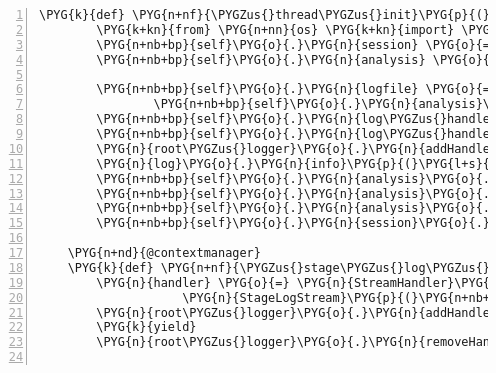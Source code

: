 \begin{Verbatim}[commandchars=\\\{\},numbers=left,firstnumber=1,stepnumber=5]
    \PYG{k}{def} \PYG{n+nf}{\PYGZus{}thread\PYGZus{}init}\PYG{p}{(}\PYG{n+nb+bp}{self}\PYG{p}{)}\PYG{p}{:}
        \PYG{k+kn}{from} \PYG{n+nn}{os} \PYG{k+kn}{import} \PYG{n}{path}
        \PYG{n+nb+bp}{self}\PYG{o}{.}\PYG{n}{session} \PYG{o}{=} \PYG{n}{DBSession}\PYG{p}{(}\PYG{n}{bind}\PYG{o}{=}\PYG{n}{create\PYGZus{}engine}\PYG{p}{(}\PYG{n}{rnaseqlyze}\PYG{o}{.}\PYG{n}{db\PYGZus{}url}\PYG{p}{)}\PYG{p}{)}
        \PYG{n+nb+bp}{self}\PYG{o}{.}\PYG{n}{analysis} \PYG{o}{=} \PYG{n+nb+bp}{self}\PYG{o}{.}\PYG{n}{session}\PYG{o}{.}\PYG{n}{query}\PYG{p}{(}\PYG{n}{Analysis}\PYG{p}{)}\PYG{o}{.}\PYG{n}{get}\PYG{p}{(}\PYG{n+nb+bp}{self}\PYG{o}{.}\PYG{n}{analysis\PYGZus{}id}\PYG{p}{)}

        \PYG{n+nb+bp}{self}\PYG{o}{.}\PYG{n}{logfile} \PYG{o}{=} \PYG{n+nb}{open}\PYG{p}{(}\PYG{n}{path}\PYG{o}{.}\PYG{n}{join}\PYG{p}{(}
                \PYG{n+nb+bp}{self}\PYG{o}{.}\PYG{n}{analysis}\PYG{o}{.}\PYG{n}{data\PYGZus{}dir}\PYG{p}{,} \PYG{l+s}{"}\PYG{l+s}{rna-seqlyze-worker.log}\PYG{l+s}{"}\PYG{p}{)}\PYG{p}{,} \PYG{l+s}{"}\PYG{l+s}{w}\PYG{l+s}{"}\PYG{p}{)}
        \PYG{n+nb+bp}{self}\PYG{o}{.}\PYG{n}{log\PYGZus{}handler} \PYG{o}{=} \PYG{n}{StreamHandler}\PYG{p}{(}\PYG{n+nb+bp}{self}\PYG{o}{.}\PYG{n}{logfile}\PYG{p}{)}
        \PYG{n+nb+bp}{self}\PYG{o}{.}\PYG{n}{log\PYGZus{}handler}\PYG{o}{.}\PYG{n}{setFormatter}\PYG{p}{(}\PYG{n}{Formatter}\PYG{p}{(}\PYG{n}{log\PYGZus{}format}\PYG{p}{)}\PYG{p}{)}
        \PYG{n}{root\PYGZus{}logger}\PYG{o}{.}\PYG{n}{addHandler}\PYG{p}{(}\PYG{n+nb+bp}{self}\PYG{o}{.}\PYG{n}{log\PYGZus{}handler}\PYG{p}{)}
        \PYG{n}{log}\PYG{o}{.}\PYG{n}{info}\PYG{p}{(}\PYG{l+s}{"}\PYG{l+s}{starting work on analysis \PYGZsh{}}\PYG{l+s+si}{\PYGZpc{}d}\PYG{l+s}{"} \PYG{o}{\PYGZpc{}} \PYG{n+nb+bp}{self}\PYG{o}{.}\PYG{n}{analysis\PYGZus{}id}\PYG{p}{)}
        \PYG{n+nb+bp}{self}\PYG{o}{.}\PYG{n}{analysis}\PYG{o}{.}\PYG{n}{finished} \PYG{o}{=} \PYG{n+nb+bp}{False}
        \PYG{n+nb+bp}{self}\PYG{o}{.}\PYG{n}{analysis}\PYG{o}{.}\PYG{n}{started} \PYG{o}{=} \PYG{n+nb+bp}{True}
        \PYG{n+nb+bp}{self}\PYG{o}{.}\PYG{n}{analysis}\PYG{o}{.}\PYG{n}{error} \PYG{o}{=} \PYG{n+nb+bp}{None}
        \PYG{n+nb+bp}{self}\PYG{o}{.}\PYG{n}{session}\PYG{o}{.}\PYG{n}{commit}\PYG{p}{(}\PYG{p}{)}

    \PYG{n+nd}{@contextmanager}
    \PYG{k}{def} \PYG{n+nf}{\PYGZus{}stage\PYGZus{}log\PYGZus{}manager}\PYG{p}{(}\PYG{n+nb+bp}{self}\PYG{p}{,} \PYG{n}{stage}\PYG{p}{)}\PYG{p}{:}
        \PYG{n}{handler} \PYG{o}{=} \PYG{n}{StreamHandler}\PYG{p}{(}
                    \PYG{n}{StageLogStream}\PYG{p}{(}\PYG{n+nb+bp}{self}\PYG{o}{.}\PYG{n}{analysis}\PYG{p}{,} \PYG{n}{stage}\PYG{p}{,} \PYG{n+nb+bp}{self}\PYG{o}{.}\PYG{n}{session}\PYG{p}{)}\PYG{p}{)}
        \PYG{n}{root\PYGZus{}logger}\PYG{o}{.}\PYG{n}{addHandler}\PYG{p}{(}\PYG{n}{handler}\PYG{p}{)}
        \PYG{k}{yield}
        \PYG{n}{root\PYGZus{}logger}\PYG{o}{.}\PYG{n}{removeHandler}\PYG{p}{(}\PYG{n}{handler}\PYG{p}{)}


\end{Verbatim}
